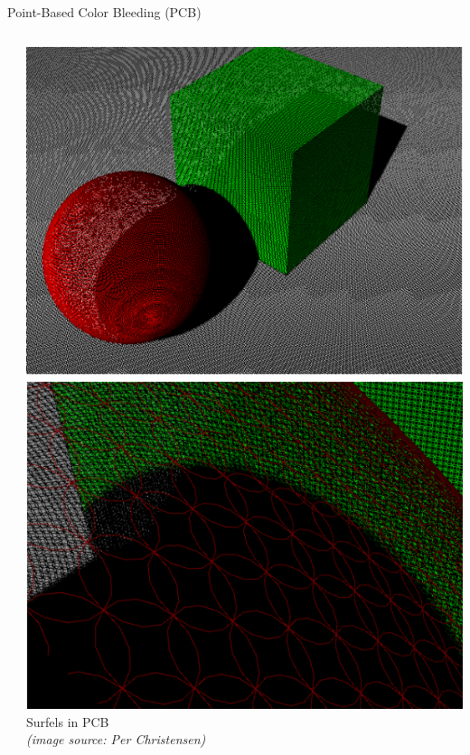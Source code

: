 \documentclass[10pt,compress,professionalfont]{beamer}
\begin{document}
\begin{frame}{Point-Based Color Bleeding (PCB)}
\begin{columns}
\begin{column}{0.65\textwidth}
        \end{column}
        \begin{column}{0.35\textwidth}
            {\centering
                \vspace{-4mm}
                \includegraphics[width=\textwidth]{../img/external/pcb}\\
                \scriptsize Surfels in PCB\\\textit{(image source: Per Christensen)}
            }
        \end{column}
    \end{columns}

\end{frame}
\end{document}
